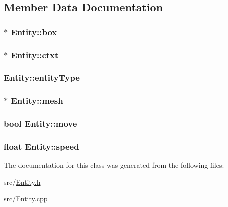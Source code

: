 \subsection{Member Data Documentation}
\hypertarget{class_entity_aba343b718e9fdd8d27041bebc7bc5885}{
\subsubsection[{box}]{$\ast$ Entity\-::box}}\label{class_entity_aba343b718e9fdd8d27041bebc7bc5885}
\hypertarget{class_entity_abfdb0e47275191119d445f868fda66dd}{
\subsubsection[{ctxt}]{$\ast$ Entity\-::ctxt}}\label{class_entity_abfdb0e47275191119d445f868fda66dd}
\hypertarget{class_entity_ac8f79ba45e199ebfead685eb61787c00}{
\subsubsection[{entity\-Type}]{ Entity\-::entity\-Type}}\label{class_entity_ac8f79ba45e199ebfead685eb61787c00}
\hypertarget{class_entity_a59fc8989c8317562a370c6d681f186ed}{
\subsubsection[{mesh}]{$\ast$ Entity\-::mesh}}\label{class_entity_a59fc8989c8317562a370c6d681f186ed}
\hypertarget{class_entity_aa7c25fb47375d3d50235f11a53666981}{
\subsubsection[{move}]{\setlength{\rightskip}{0pt plus 5cm}bool Entity\-::move}}\label{class_entity_aa7c25fb47375d3d50235f11a53666981}
\hypertarget{class_entity_a1de3d8d9ab8088f61e6726069b26fa60}{
\subsubsection[{speed}]{\setlength{\rightskip}{0pt plus 5cm}float Entity\-::speed}}\label{class_entity_a1de3d8d9ab8088f61e6726069b26fa60}


The documentation for this class was generated from the following files\-:\begin{DoxyCompactItemize}
\item 
src/\hyperlink{_entity_8h}{Entity.\-h}\item 
src/\hyperlink{_entity_8cpp}{Entity.\-cpp}\end{DoxyCompactItemize}
